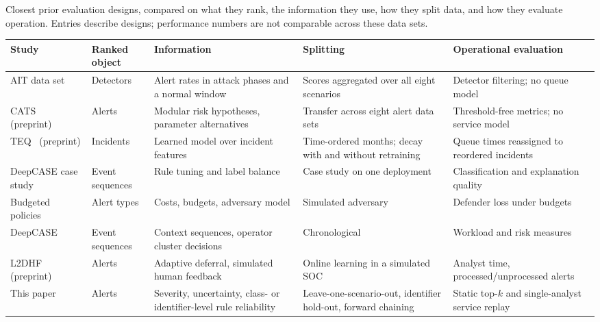 \documentclass[pdflatex,sn-basic,Numbered]{sn-jnl}
\begin{document}
\begin{tableorg}[t]
\centering
\caption{Closest prior evaluation designs, compared on what they rank, the information they use, how they split data, and how they evaluate operation. Entries describe designs; performance numbers are not comparable across these data sets.}
\label{tab:designs}
\footnotesize
\setlength{\tabcolsep}{3pt}
\begin{tabular}{>{\raggedright\arraybackslash}p{}>{\raggedright\arraybackslash}p{}>{\raggedright\arraybackslash}p{}>{\raggedright\arraybackslash}p{}>{\raggedright\arraybackslash}p{}}
\toprule
Study & Ranked object & Information & Splitting & Operational evaluation \\
\midrule
AIT data set~\citep{Landauer2024AITADS} & Detectors & Alert rates in attack phases and a normal window & Scores aggregated over all eight scenarios & Detector filtering; no queue model \\
CATS~\citep{Uetz2026CATS} (preprint) & Alerts & Modular risk hypotheses, parameter alternatives & Transfer across eight alert data sets & Threshold-free metrics; no service model \\
TEQ~\citep{Gelman2023TEQ} (preprint) & Incidents & Learned model over incident features & Time-ordered months; decay with and without retraining & Queue times reassigned to reordered incidents \\
DeepCASE case study~\citep{Teuwen2025RulesetTuning} & Event sequences & Rule tuning and label balance & Case study on one deployment & Classification and explanation quality \\
Budgeted policies~\citep{Tong2020MovingHaystack} & Alert types & Costs, budgets, adversary model & Simulated adversary & Defender loss under budgets \\
DeepCASE~\citep{vanEde2022DeepCASE} & Event sequences & Context sequences, operator cluster decisions & Chronological & Workload and risk measures \\
L2DHF~\citep{Jalalvand2025L2DHF} (preprint) & Alerts & Adaptive deferral, simulated human feedback & Online learning in a simulated SOC & Analyst time, processed/unprocessed alerts \\
\midrule
This paper & Alerts & Severity, uncertainty, class- or identifier-level rule reliability & Leave-one-scenario-out, identifier hold-out, forward chaining & Static top-$k$ and single-analyst service replay \\
\bottomrule
\end{tabular}
\end{tableorg}
\end{document}
